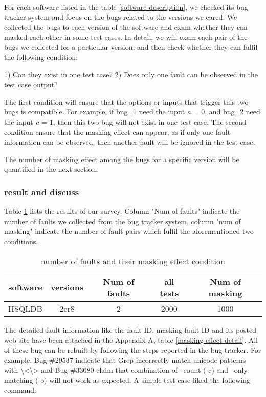 \documentclass{sig-alternate}
\begin{document}
For each software listed in the table \ref{software description}, we checked its bug tracker system and focus on the bugs related to the versions we cared. We collected the bugs to each version of the software and exam whether they can masked each other in some test cases. In detail, we will exam each pair of the bugs we collected for a particular version, and then check whether they can fulfil the following condition:

1) Can they exist in one test case?  2) Does only one fault can be observed in the test case output?

The first condition will ensure that the options or inputs that trigger this two bugs is compatible. For example, if bug\_1 need the input \emph{a} = 0, and bug\_2 need the input \emph{a} = 1, then this two bug will not exist in one test case. The second condition ensure that the masking effect can appear, as if only one fault information can be observed, then another fault will be ignored in the test case.

The number of masking effect among the bugs for a specific version will be quantified in the next section.

\subsubsection{result and discuss}

Table \ref{masking effect condition} lists the results of our survey. Column "Num of faults" indicate the number of faults we collected from the bug tracker system, column "num of masking" indicate the number of fault pairs which fulfil the aforementioned two conditions. 

\begin{table}\renewcommand{\arraystretch}{1.3}
\caption{number of faults and their masking effect condition}
\label{masking effect condition}
\begin{tabular}{c|c|c|c|c} \hline
software & versions & Num of faults & all tests & Num of masking\\ \hline
HSQLDB & 2cr8 & 2 & 2000 & 1000\\ \hline
\hline\end{tabular}
\end{table}


The detailed fault information like the fault ID, masking fault ID and its posted web site have been attached in the Appendix A, table \ref{masking effect detail}. All of these bug can be rebuilt by following the steps reported in the bug tracker. For example, Bug-\#29537 indicate that Grep incorrectly match unicode patterns with \textbackslash<\textbackslash>  and Bug-\#33080 claim that combination of --count (-c) and --only-matching (-o) will not work as expected. A simple test case liked the following command:
\end{document}

